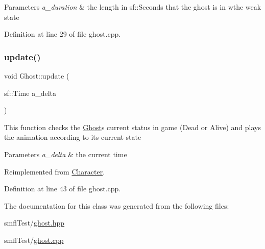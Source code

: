 \begin{DoxyParams}{Parameters}
{\em a\+\_\+duration} & the length in sf\+::\+Seconds that the ghost is in wthe weak state \\
\hline
\end{DoxyParams}


Definition at line 29 of file ghost.\+cpp.

\mbox{\label{class_ghost_a164e0607f7ea0d72d756bdf964e66b90}} 
\subsubsection{\texorpdfstring{update()}{update()}}
{\footnotesize\ttfamily void Ghost\+::update (\begin{DoxyParamCaption}\item[{sf\+::\+Time}]{a\+\_\+delta }\end{DoxyParamCaption})\hspace{0.3cm}{\ttfamily [virtual]}}

This function checks the \hyperlink{class_ghost}{Ghost}\textquotesingle{}s current status in game (Dead or Alive) and plays the animation according to it\textquotesingle{}s current state


\begin{DoxyParams}{Parameters}
{\em a\+\_\+delta} & the current time \\
\hline
\end{DoxyParams}


Reimplemented from \hyperlink{class_character_a89b72b507971ba8648909980d045ed06}{Character}.



Definition at line 43 of file ghost.\+cpp.



The documentation for this class was generated from the following files\+:\begin{DoxyCompactItemize}
\item 
smfl\+Test/\hyperlink{ghost_8hpp}{ghost.\+hpp}\item 
smfl\+Test/\hyperlink{ghost_8cpp}{ghost.\+cpp}\end{DoxyCompactItemize}
